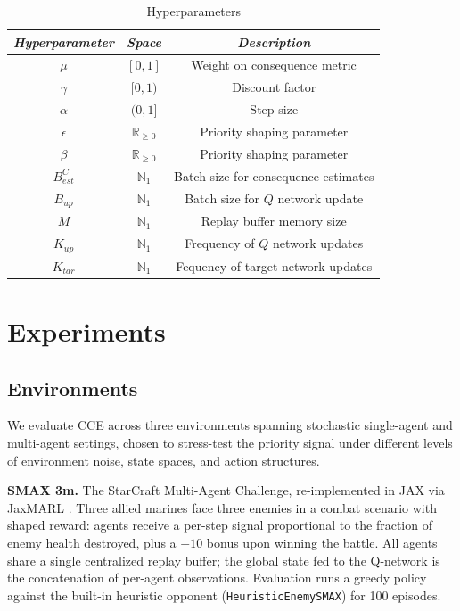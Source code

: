 \documentclass[conference]{IEEEtran}
\begin{document}
\begin{table}[htbp]
\caption{Hyperparameters}
\begin{center}
\begin{tabular}{|c|c|c|}
\hline
 \textbf{\textit{Hyperparameter}}& \textbf{\textit{Space}}& \textbf{\textit{Description}} \\
\hline
$\mu$ & $[0,1]$ & Weight on consequence metric \\
$\gamma$ & $[0,1)$ & Discount factor \\
$\alpha$ & $(0,1]$ & Step size \\
$\epsilon$ & $\mathbb{R}_{\geq0}$ & Priority shaping parameter \\
$\beta$ & $\mathbb{R}_{\geq0}$ & Priority shaping parameter \\
$B_{est}^C$ & $\mathbb{N}_1$ & Batch size for consequence estimates \\
$B_{up}$ & $\mathbb{N}_1$ & Batch size for $Q$ network update \\
$M$ & $\mathbb{N}_1$ & Replay buffer memory size \\
$K_{up}$ & $\mathbb{N}_1$ & Frequency of $Q$ network updates \\
$K_{tar}$ & $\mathbb{N}_1$ & Fequency of target network updates \\
\hline
\end{tabular}
\label{tab1}
\end{center}
\end{table}

\section{Experiments}

\subsection{Environments}

\noindent We evaluate CCE across three environments spanning stochastic single-agent and multi-agent settings, chosen to stress-test the priority signal under different levels of environment noise, state spaces, and action structures.

\textbf{SMAX 3m.} The StarCraft Multi-Agent Challenge, re-implemented in JAX via JaxMARL \cite{jaxmarl2023}. Three allied marines face three enemies in a combat scenario with shaped reward: agents receive a per-step signal proportional to the fraction of enemy health destroyed, plus a $+10$ bonus upon winning the battle. All agents share a single centralized replay buffer; the global state fed to the Q-network is the concatenation of per-agent observations. Evaluation runs a greedy policy against the built-in heuristic opponent (\texttt{HeuristicEnemySMAX}) for 100 episodes.
\end{document}
